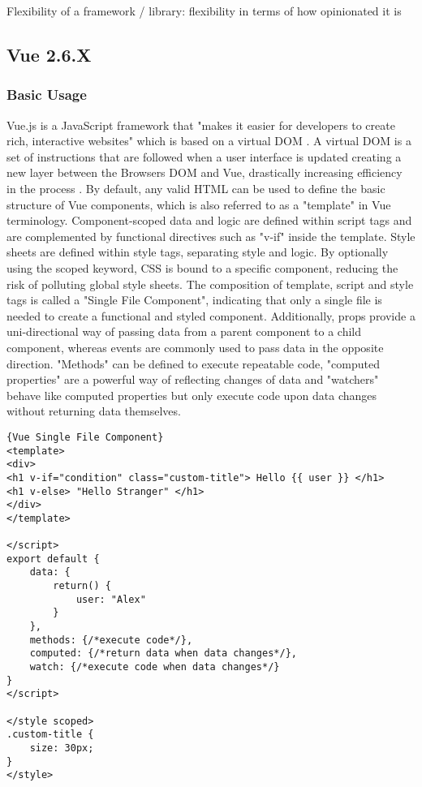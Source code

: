 Flexibility of a framework / library: flexibility in terms of how opinionated it is


\subsection{Vue 2.6.X}

\subsubsection{Basic Usage}
Vue.js is a JavaScript framework that "makes it easier for developers to create rich, interactive websites" \cite{macrae2018vue} which is based on a virtual DOM \cite{ComparisonVue:online}. A virtual DOM is a set of instructions that are followed when a user interface is updated \cite[p.~81]{LearningReactBanks:book} creating a new layer between the Browsers DOM and Vue, drastically increasing efficiency in the process \cite{LearningReactBanks:book}. By default, any valid HTML can be used to define the basic structure of Vue components, which is also referred to as a "template" in Vue terminology. Component-scoped data and logic are defined within script tags and are complemented by functional directives such as "v-if" inside the template. Style sheets are defined within style tags, separating style and logic. By optionally using the scoped keyword, CSS is bound to a specific component, reducing the risk of polluting global style sheets. The composition of template, script and style tags is called a "Single File Component", indicating that only a single file is needed to create a functional and styled component. Additionally, props provide a uni-directional way of passing data from a parent component to a child component, whereas events are commonly used to pass data in the opposite direction. "Methods" can be defined to execute repeatable code, "computed properties" are a powerful way of reflecting changes of data and "watchers" behave like computed properties but only execute code upon data changes without returning data themselves.

\begin{lstlisting}[caption=Vue Single File Component, captionpos=b, style=htmlcssjs]{Vue Single File Component}
<template>
<div>
<h1 v-if="condition" class="custom-title"> Hello {{ user }} </h1>
<h1 v-else> "Hello Stranger" </h1>
</div>
</template>

</script>
export default {
    data: {
        return() {
            user: "Alex"
        }
    },
    methods: {/*execute code*/},
    computed: {/*return data when data changes*/},
    watch: {/*execute code when data changes*/}
}
</script>

</style scoped>
.custom-title {
    size: 30px;
}
</style>
\end{lstlisting}

